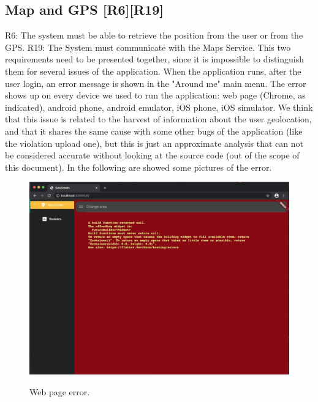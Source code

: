 \documentclass[../ATD.tex]{subfiles}
\begin{document}
    \subsection{Map and GPS [R6][R19]}\label{subsec:map-and-gps}
    R6: The system must be able to retrieve the position from the user or from the GPS.
    \newline
    R19: The System must communicate with the Maps Service.
    \newline
    This two requirements need to be presented together, since it is impossible to distinguish them for several issues of the application.
    \newline
    When the application runs, after the user login, an error message is shown in the "Around me" main menu.
    The error shows up on every device we used to run the application: web page (Chrome, as indicated), android phone, android emulator, iOS phone, iOS simulator.
    We think that this issue is related to the harvest of information about the user geolocation, and that it shares the same cause with some other bugs of the application (like the violation upload one), but this is just an approximate analysis that can not be considered accurate without looking at the source code (out of the scope of this document).
    In the following are showed some pictures of the error.
    \newline
    \begin{figure}[H]
        \centering
        \includegraphics[scale = 0.4]{assets/web_page_error.png}\\
        \caption[Web page error]{Web page error.}
    \end{figure}
\end{document}
